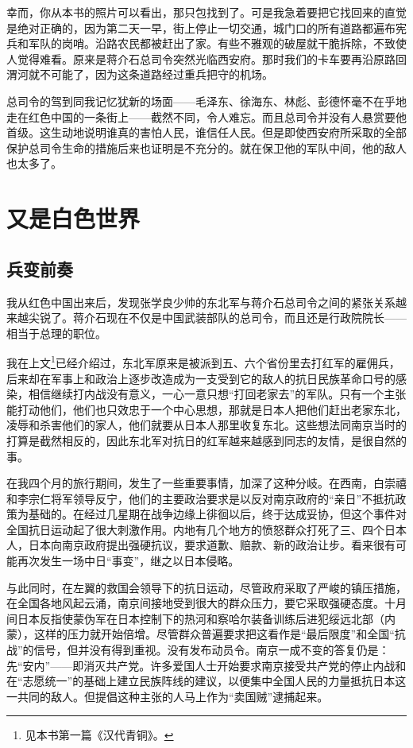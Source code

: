 \documentclass[10pt]{book}
\begin{document}
幸而，你从本书的照片可以看出，那只包找到了。可是我急着要把它找回来的直觉是绝对正确的，因为第二天一早，街上停止一切交通，城门口的所有道路都遍布宪兵和军队的岗哨。沿路农民都被赶出了家。有些不雅观的破屋就干脆拆除，不致使人觉得难看。原来是蒋介石总司令突然光临西安府。那时我们的卡车要再沿原路回渭河就不可能了，因为这条道路经过重兵把守的机场。

总司令的驾到同我记忆犹新的场面——毛泽东、徐海东、林彪、彭德怀毫不在乎地走在红色中国的一条街上——截然不同，令人难忘。而且总司令并没有人悬赏要他首级。这生动地说明谁真的害怕人民，谁信任人民。但是即使西安府所采取的全部保护总司令生命的措施后来也证明是不充分的。就在保卫他的军队中间，他的敌人也太多了。



\chapter{又是白色世界}

\section{兵变前奏}

我从红色中国出来后，发现张学良少帅的东北军与蒋介石总司令之间的紧张关系越来越尖锐了。蒋介石现在不仅是中国武装部队的总司令，而且还是行政院院长——相当于总理的职位。

我在上文\footnote{见本书第一篇《汉代青铜》。}已经介绍过，东北军原来是被派到五、六个省份里去打红军的雇佣兵，后来却在军事上和政治上逐步改造成为一支受到它的敌人的抗日民族革命口号的感染，相信继续打内战没有意义，一心一意只想“打回老家去”的军队。只有一个主张能打动他们，他们也只效忠于一个中心思想，那就是日本人把他们赶出老家东北，凌辱和杀害他们的家人，他们就要从日本人那里收复东北。这些想法同南京当时的打算是截然相反的，因此东北军对抗日的红军越来越感到同志的友情，是很自然的事。

在我四个月的旅行期间，发生了一些重要事情，加深了这种分岐。在西南，白崇禧和李宗仁将军领导反宁，他们的主要政治要求是以反对南京政府的“亲日”不抵抗政策为基础的。在经过几星期在战争边缘上徘徊以后，终于达成妥协，但这个事件对全国抗日运动起了很大刺激作用。内地有几个地方的愤怒群众打死了三、四个日本人，日本向南京政府提出强硬抗议，要求道歉、赔款、新的政治让步。看来很有可能再次发生一场中日“事变”，继之以日本侵略。

与此同时，在左翼的救国会领导下的抗日运动，尽管政府采取了严峻的镇压措施，在全国各地风起云涌，南京间接地受到很大的群众压力，要它采取强硬态度。十月间日本反指使蒙伪军在日本控制下的热河和察哈尔装备训练后进犯绥远北部（内蒙），这样的压力就开始倍增。尽管群众普遍要求把这看作是“最后限度”和全国“抗战”的信号，但并没有得到重视。没有发布动员令。南京一成不变的答复仍是：先“安内”——即消灭共产党。许多爱国人士开始要求南京接受共产党的停止内战和在“志愿统一”的基础上建立民族阵线的建议，以便集中全国人民的力量抵抗日本这一共同的敌人。但提倡这种主张的人马上作为“卖国贼”逮捕起来。
\end{document}
